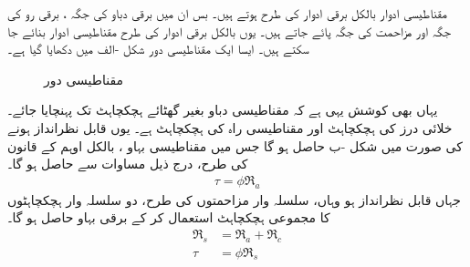مقناطیسی ادوار بالکل برقی ادوار کی طرح ہوتے ہیں۔ بس ان میں برقی دباو  کی جگہ   ، برقی رو   کی جگہ    اور مزاحمت  کی جگہ     پائے جاتے ہیں۔ یوں  بالکل برقی ادوار کی طرح مقناطیسی ادوار بنائے جا سکتے ہیں۔  ایسا ایک مقناطیسی دور شکل -الف میں دکھایا گیا ہے۔
\begin{figure}
\centering
\begin{subfigure}[b]{0.40\textwidth}
\centering
{}%
\caption{}
\end{subfigure}\hfill
\begin{subfigure}[b]{0.50\textwidth}
\centering
{}
\caption{}
\end{subfigure}
\caption{مقناطیسی دور}
\label{شکل_مقناطیسی__مقناطیسی_سلسلہ_وار_دور}
\end{figure}
%
یہاں بھی کوشش یہی ہے کہ  مقناطیسی دباو   بغیر گھٹائے ہچکچاہٹ  تک پہنچایا جائے۔ خلائی درز کی ہچکچاہٹ     اور مقناطیسی راہ کی ہچکچاہٹ   ہے۔ یوں  قابل نظرانداز ہونے کی صورت میں  شکل -ب حاصل ہو گا جس میں مقناطیسی بہاو ، بالکل اوہم کے قانون کی طرح، درج ذیل مساوات سے حاصل ہو گا۔
\begin{align}\label{مساوات_مقناطیسی_دور_قانون_اوہم}
\tau=\phi \Re_a
\end{align}
جہاں   قابل  نظرانداز ہو وہاں، سلسلہ وار مزاحمتوں کی طرح،  دو سلسلہ وار ہچکچاہٹوں کا مجموعی ہچکچاہٹ    استعمال کر کے برقی بہاو حاصل ہو گا۔
\begin{align}
\Re_s&=\Re_a+\Re_c\\
\tau&=\phi \Re_s \label{مساوات_مقناطیسی_دور_مقناطیسی_اوہم_قانون}
\end{align}

